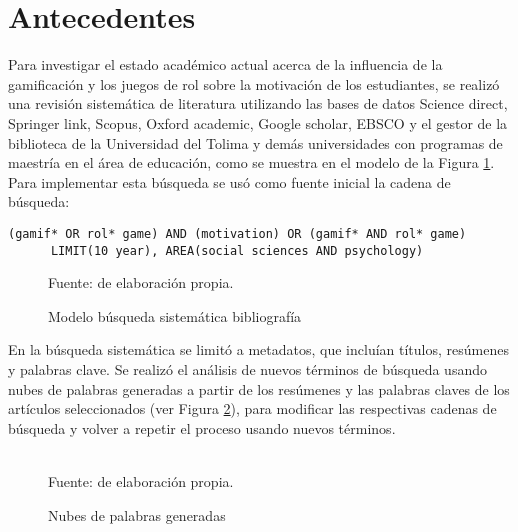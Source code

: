 %
\section{Antecedentes}

Para investigar el estado académico actual acerca de la influencia de la gamificación y los juegos de rol 
sobre la motivación de los estudiantes, se realizó una revisión sistemática de literatura utilizando las bases 
de datos Science direct, Springer link, Scopus, Oxford academic, Google scholar, EBSCO y el gestor de la 
biblioteca de la Universidad del Tolima y demás universidades con programas de maestría en el área de 
educación, como se muestra en el modelo de la Figura \ref{img:busqueda}. Para implementar esta búsqueda se 
usó como fuente inicial la cadena de búsqueda:

\begin{center}\ttfamily{}    %
\begin{minipage}{64\wd0}              %
\begin{verbatim}
(gamif* OR rol* game) AND (motivation) OR (gamif* AND rol* game)
      LIMIT(10 year), AREA(social sciences AND psychology)
\end{verbatim}
\end{minipage}
\end{center}

\begin{figure}[ht]
\caption{Modelo búsqueda sistemática bibliografía}
\label{img:busqueda}
\centering

{\footnotesize Fuente: de elaboración propia.}
\end{figure}

En la búsqueda sistemática se limitó a metadatos, que incluían títulos, resúmenes y palabras clave. Se realizó 
el análisis de nuevos términos de búsqueda usando nubes de palabras generadas a partir de los resúmenes y las 
palabras claves de los artículos seleccionados (ver Figura \ref{img:nube}), para modificar las respectivas 
cadenas de búsqueda y volver a repetir el proceso usando nuevos términos. 

\begin{figure}[ht]
  \caption{Nubes de palabras generadas}
  \label{img:nube}
  \centering
  \hfill
  \\
  {\footnotesize Fuente: de elaboración propia.}
\end{figure}


